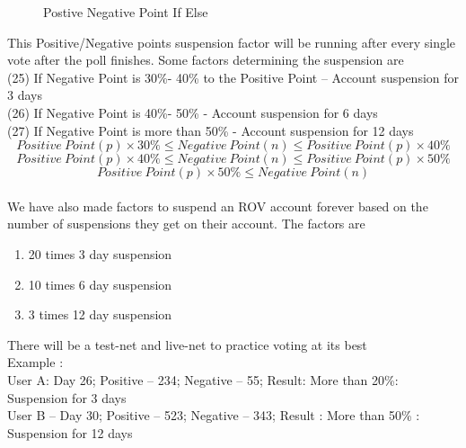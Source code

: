 \documentclass[10pt]{article}
\begin{document}
\begin{figure}[H]
\begin{center}
\caption{Postive Negative Point If Else}
\end{center}
\end{figure}

This Positive/Negative points suspension factor will be running after every single vote after the poll finishes. Some factors determining the suspension are\\

(25) If Negative Point is 30\%- 40\% to the Positive Point – Account suspension for 3 days\\
(26) If Negative Point is 40\%- 50\% - Account suspension for 6 days\\
(27) If Negative Point is more than 50\% - Account suspension for 12 days\\

\begin{equation}
Positive\:Point(p) \times  30\% \leq Negative\:Point(n) \leq Positive\:Point(p) \times  40\%
\end{equation}
\begin{equation}
Positive\:Point(p) \times  40\% \leq Negative\:Point(n) \leq Positive\:Point(p) \times  50\%
\end{equation}
\begin{equation}
Positive\:Point(p) \times 50\% \leq Negative\:Point(n)
\end{equation}\\

We have also made factors to suspend an ROV account forever based on the number of suspensions they get on their account. The factors are\\

\begin{enumerate}[leftmargin=+0.2in]
\item 20 times 3 day suspension 
\item 10 times 6 day suspension
\item 3 times 12 day suspension
\end{enumerate}



There will be a test-net and live-net to practice voting at its best\\

Example : \\

User A: Day 26; Positive – 234; Negative – 55; Result: More than 20\%: Suspension for 3 days\\
User B – Day 30; Positive – 523; Negative – 343; Result : More than 50\% : Suspension for 12 days\\
\end{document}
